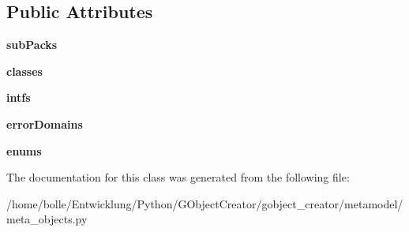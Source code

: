 \subsection*{Public Attributes}
\begin{DoxyCompactItemize}
\item 
\hypertarget{classgobject__creator_1_1metamodel_1_1meta__objects_1_1Package_1_1__InternalPack_a84ca15612e51c2094a1fc44f3fed9ba4}{
{\bfseries subPacks}}
\label{classgobject__creator_1_1metamodel_1_1meta__objects_1_1Package_1_1__InternalPack_a84ca15612e51c2094a1fc44f3fed9ba4}

\item 
\hypertarget{classgobject__creator_1_1metamodel_1_1meta__objects_1_1Package_1_1__InternalPack_addbfef8ab0261d69a752ef9334696390}{
{\bfseries classes}}
\label{classgobject__creator_1_1metamodel_1_1meta__objects_1_1Package_1_1__InternalPack_addbfef8ab0261d69a752ef9334696390}

\item 
\hypertarget{classgobject__creator_1_1metamodel_1_1meta__objects_1_1Package_1_1__InternalPack_af7c71dca03ba6d5555246b0625ea2f1b}{
{\bfseries intfs}}
\label{classgobject__creator_1_1metamodel_1_1meta__objects_1_1Package_1_1__InternalPack_af7c71dca03ba6d5555246b0625ea2f1b}

\item 
\hypertarget{classgobject__creator_1_1metamodel_1_1meta__objects_1_1Package_1_1__InternalPack_a507367201521cc33b869d7c3fdbdbcee}{
{\bfseries errorDomains}}
\label{classgobject__creator_1_1metamodel_1_1meta__objects_1_1Package_1_1__InternalPack_a507367201521cc33b869d7c3fdbdbcee}

\item 
\hypertarget{classgobject__creator_1_1metamodel_1_1meta__objects_1_1Package_1_1__InternalPack_ad82d6a3b8d9af4878b6ad87eed801c81}{
{\bfseries enums}}
\label{classgobject__creator_1_1metamodel_1_1meta__objects_1_1Package_1_1__InternalPack_ad82d6a3b8d9af4878b6ad87eed801c81}

\end{DoxyCompactItemize}


The documentation for this class was generated from the following file:\begin{DoxyCompactItemize}
\item 
/home/bolle/Entwicklung/Python/GObjectCreator/gobject\_\-creator/metamodel/meta\_\-objects.py\end{DoxyCompactItemize}
